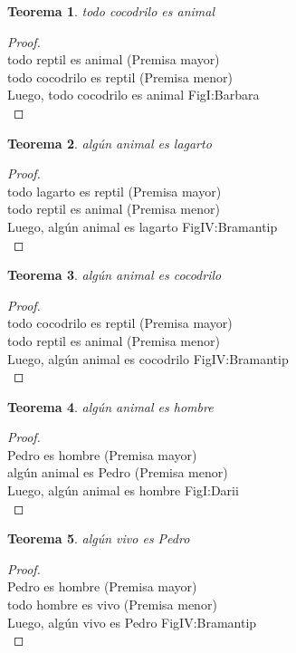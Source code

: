 ﻿\documentclass[12pt]{book}
\newtheorem{theorem}{Teorema}[chapter]
\newtheorem{proof}{Demostración}
\begin{document}
\begin{theorem}
todo cocodrilo es animal
\label{th: 32}
\end{theorem}\begin{proof}\\todo reptil es animal	 (Premisa mayor) \\todo cocodrilo es reptil	 (Premisa menor) \\Luego, todo cocodrilo es animal	FigI:Barbara \\ \end{proof}
\begin{theorem}
algún animal es lagarto
\label{th: 33}
\end{theorem}\begin{proof}\\todo lagarto es reptil	 (Premisa mayor) \\todo reptil es animal	 (Premisa menor) \\Luego, algún animal es lagarto	FigIV:Bramantip \\ \end{proof}
\begin{theorem}
algún animal es cocodrilo
\label{th: 34}
\end{theorem}\begin{proof}\\todo cocodrilo es reptil	 (Premisa mayor) \\todo reptil es animal	 (Premisa menor) \\Luego, algún animal es cocodrilo	FigIV:Bramantip \\ \end{proof}
\begin{theorem}
algún animal es hombre
\label{th: 35}
\end{theorem}\begin{proof}\\Pedro es hombre	 (Premisa mayor) \\algún animal es Pedro	 (Premisa menor) \\Luego, algún animal es hombre	FigI:Darii \\ \end{proof}
\begin{theorem}
algún vivo es Pedro
\label{th: 36}
\end{theorem}\begin{proof}\\Pedro es hombre	 (Premisa mayor) \\todo hombre es vivo	 (Premisa menor) \\Luego, algún vivo es Pedro	FigIV:Bramantip \\ \end{proof}
\end{document}

